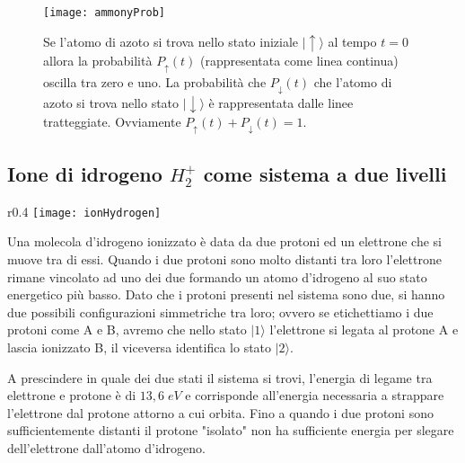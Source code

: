 \begin{figure}[!ht]
\vspace{0.1in}
\texttt{[image: ammonyProb]}	
\centering
\vspace{0.3in}
\caption{Se l'atomo di azoto si trova nello stato iniziale $|\uparrow \rangle$ al tempo $t=0$  allora la probabilit\`a $P_{\uparrow}(t)$ (rappresentata come linea continua) oscilla tra zero e uno. La probabilit\`a che $P_{\downarrow}(t)$ che l'atomo di azoto si trova nello stato $|\downarrow \rangle$ \`e rappresentata dalle linee tratteggiate. Ovviamente $P_{\uparrow}(t) + P_{\downarrow}(t) =1$.}
\end{figure}

\subsection{Ione di idrogeno $H_2^+$ come sistema a due livelli}

\begin{wrapfigure}{r}{0.4\textwidth} %
    \centering
    \texttt{[image: ionHydrogen]} %
\end{wrapfigure}
Una molecola d'idrogeno ionizzato \`e data da due protoni ed un elettrone che si muove tra di essi. Quando i due protoni sono molto distanti tra loro l'elettrone rimane vincolato ad uno dei due formando un atomo d'idrogeno  al suo stato energetico  pi\`u basso. Dato che i protoni presenti nel sistema sono due, si hanno due possibili configurazioni simmetriche tra loro; ovvero se etichettiamo i due protoni come A e B, avremo che nello stato $|1 \rangle $  l'elettrone si legata al protone A e lascia ionizzato B, il viceversa identifica lo stato $|2 \rangle$.

A prescindere in quale dei due stati il sistema si trovi, l'energia di legame tra elettrone e protone \`e di $13,6 \; eV$ e corrisponde all'energia necessaria a strappare l'elettrone dal protone attorno a cui orbita. Fino a quando i due protoni sono sufficientemente distanti il protone "isolato" non ha sufficiente energia per slegare dell'elettrone dall'atomo d'idrogeno. 

